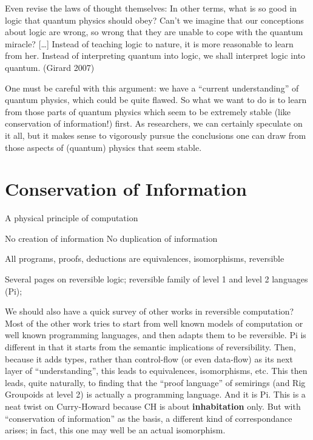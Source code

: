 \documentclass{article}
\begin{document}
Even revise the laws of thought themselves: In other terms, what is so
good in logic that quantum physics should obey? Can't we imagine that
our conceptions about logic are wrong, so wrong that they are unable
to cope with the quantum miracle? [\ldots] Instead of teaching logic
to nature, it is more reasonable to learn from her. Instead of
interpreting quantum into logic, we shall interpret logic into
quantum. (Girard 2007)

One must be careful with this argument: we have a ``current
understanding'' of quantum physics, which could be quite flawed.  So
what we want to do is to learn from those parts of quantum physics
which seem to be extremely stable (like conservation of information!)
first. As researchers, we can certainly speculate on it all, but it
makes sense to vigorously pursue the conclusions one can draw from
those aspects of (quantum) physics that seem stable.

\section{Conservation of Information}

A physical principle of computation

No creation of information
No duplication of information

All programs, proofs, deductions are equivalences, isomorphisms,
reversible

Several pages on reversible logic; reversible family of level 1 and
level 2 languages (Pi);

We should also have a quick survey of other works in reversible
computation? Most of the other work tries to start from well known
models of computation or well known programming languages, and then
adapts them to be reversible. Pi is different in that it starts from
the semantic implications of reversibility. Then, because it adds
types, rather than control-flow (or even data-flow) as its next layer
of ``understanding'', this leads to equivalences, isomorphisms, etc.
This then leads, quite naturally, to finding that the ``proof
language'' of semirings (and Rig Groupoids at level 2) is actually a
programming language. And it is Pi. This is a neat twist on
Curry-Howard because CH is about \textbf{inhabitation} only. But with
``conservation of information'' as the basis, a different kind of
correspondance arises; in fact, this one may well be an actual
isomorphism.
\end{document}
